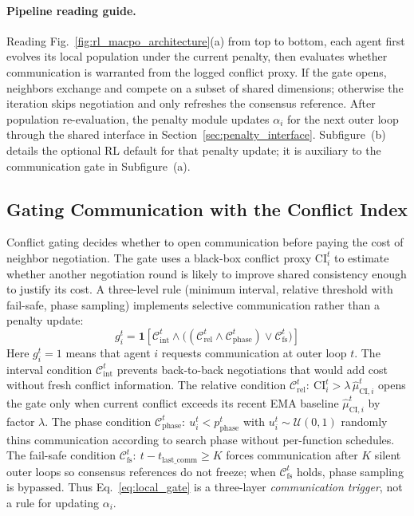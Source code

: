 \documentclass[conference]{IEEEtran}
\begin{document}
\paragraph{Pipeline reading guide.} Reading Fig.~\ref{fig:rl_macpo_architecture}(a) from top to bottom, each agent first evolves its local population under the current penalty, then evaluates whether communication is warranted from the logged conflict proxy. If the gate opens, neighbors exchange and compete on a subset of shared dimensions; otherwise the iteration skips negotiation and only refreshes the consensus reference. After population re-evaluation, the penalty module updates $\alpha_i$ for the next outer loop through the shared interface in Section~\ref{sec:penalty_interface}. Subfigure~(b) details the optional RL default for that penalty update; it is auxiliary to the communication gate in Subfigure~(a).

\subsection{Gating Communication with the Conflict Index}\label{sec:gating}
Conflict gating decides whether to open communication before paying the cost of neighbor negotiation. The gate uses a black-box conflict proxy $\mathrm{CI}_i^t$ to estimate whether another negotiation round is likely to improve shared consistency enough to justify its cost. A three-level rule (minimum interval, relative threshold with fail-safe, phase sampling) implements selective communication rather than a penalty update:
\begin{equation}
g_i^t=\mathbf{1}\left[\mathcal{C}_{\mathrm{int}}^t\land\bigl((\mathcal{C}_{\mathrm{rel}}^t\land \mathcal{C}_{\mathrm{phase}}^t)\lor \mathcal{C}_{\mathrm{fs}}^t\bigr)\right]
\label{eq:local_gate}
\end{equation}
Here $g_i^t=1$ means that agent $i$ requests communication at outer loop $t$. The interval condition $\mathcal{C}_{\mathrm{int}}^t$ prevents back-to-back negotiations that would add cost without fresh conflict information. The relative condition $\mathcal{C}_{\mathrm{rel}}^t:\ \mathrm{CI}_i^t > \lambda\,\hat{\mu}_{\mathrm{CI},i}^t$ opens the gate only when current conflict exceeds its recent EMA baseline $\hat{\mu}_{\mathrm{CI},i}^t$ by factor $\lambda$. The phase condition $\mathcal{C}_{\mathrm{phase}}^t:\ u_i^t < p_{\mathrm{phase}}^t$ with $u_i^t\sim\mathcal{U}(0,1)$ randomly thins communication according to search phase without per-function schedules. The fail-safe condition $\mathcal{C}_{\mathrm{fs}}^t:\ t-t_{\mathrm{last\_comm}}\ge K$ forces communication after $K$ silent outer loops so consensus references do not freeze; when $\mathcal{C}_{\mathrm{fs}}^t$ holds, phase sampling is bypassed. Thus Eq.~\eqref{eq:local_gate} is a three-layer \emph{communication trigger}, not a rule for updating $\alpha_i$.
\end{document}
